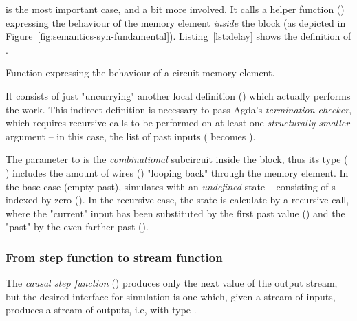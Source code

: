              is the most important case, and a bit more involved.
            It calls a helper function ()
            expressing the behaviour of the memory element \emph{inside} the  block
            (as depicted in Figure~\ref{fig:semantics-syn-fundamental}).
            Listing~\ref{lst:delay} shows the definition of .

            \begin{listing}[h]
                \caption{Function expressing the behaviour of a circuit memory element.\label{lst:delay}}
            \end{listing}

            It consists of just "uncurrying" another local definition () which actually
            performs the work.
            This indirect definition is necessary to pass Agda's \emph{termination checker},
            which requires recursive calls to be performed on at least one \emph{structurally smaller}
            argument – in this case, the list of past inputs (   becomes ).

            The  parameter to  is the \emph{combinational} subcircuit inside the  block,
            thus its type ( \AY{:} \AY{(} \AF{+} \AY{)} \AY{(} \AF{+} \AY{)})
            includes the amount of wires () "looping back" through the memory element.
            In the base case (empty past),  simulates   
            with an \emph{undefined} state – consisting of s indexed by zero ().
            In the recursive case, the state is calculate by a recursive call,
            where the "current" input has been substituted by the first past value () and the "past"
            by the even farther past ().

            \subsubsection{From step function to stream function}
            The \emph{causal step function} () produces only the next value of the
            output stream, but the desired interface for simulation is one which, given a stream of
            inputs, produces a stream of outputs, i.e, with type
             \AY{(} \AY{)}   \AY{(} \AY{)}.


